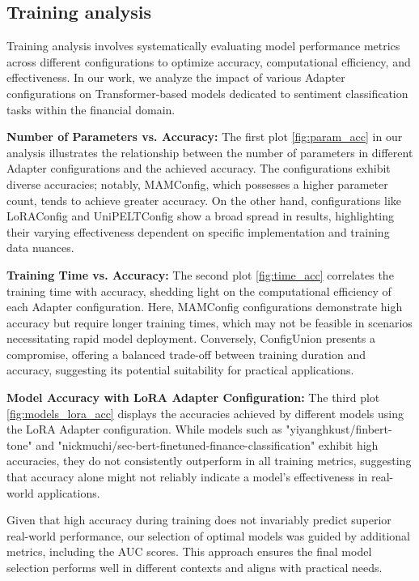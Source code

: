 \documentclass[conference]{IEEEtran}
\begin{document}
\subsection{Training analysis}%
Training analysis involves systematically evaluating model performance metrics across different configurations to optimize accuracy, computational efficiency, and effectiveness. In our work, we analyze the impact of various Adapter configurations on Transformer-based models dedicated to sentiment classification tasks within the financial domain.

\textbf{Number of Parameters vs. Accuracy:} The first plot \ref{fig:param_acc} in our analysis illustrates the relationship between the number of parameters in different Adapter configurations and the achieved accuracy. The configurations exhibit diverse accuracies; notably, MAMConfig, which possesses a higher parameter count, tends to achieve greater accuracy. On the other hand, configurations like LoRAConfig and UniPELTConfig show a broad spread in results, highlighting their varying effectiveness dependent on specific implementation and training data nuances.

\textbf{Training Time vs. Accuracy:} The second plot \ref{fig:time_acc} correlates the training time with accuracy, shedding light on the computational efficiency of each Adapter configuration. Here, MAMConfig configurations demonstrate high accuracy but require longer training times, which may not be feasible in scenarios necessitating rapid model deployment. Conversely, ConfigUnion presents a compromise, offering a balanced trade-off between training duration and accuracy, suggesting its potential suitability for practical applications.

\textbf{Model Accuracy with LoRA Adapter Configuration:} The third plot \ref{fig:models_lora_acc} displays the accuracies achieved by different models using the LoRA Adapter configuration. While models such as "yiyanghkust/finbert-tone" and "nickmuchi/sec-bert-finetuned-finance-classification" exhibit high accuracies, they do not consistently outperform in all training metrics, suggesting that accuracy alone might not reliably indicate a model's effectiveness in real-world applications.

Given that high accuracy during training does not invariably predict superior real-world performance, our selection of optimal models was guided by additional metrics, including the AUC scores. This approach ensures the final model selection performs well in different contexts and aligns with practical needs.
\end{document}
